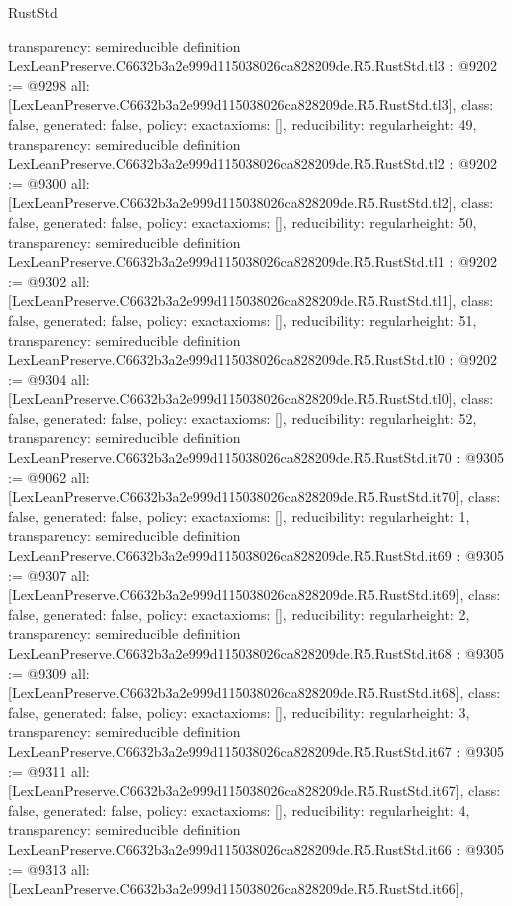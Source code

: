 \begin{lexlean}{RustStd}
\begin{coremodule}
{  transparency: semireducible
}
definition LexLeanPreserve.C6632b3a2e999d115038026ca828209de.R5.RustStd.tl3 : @9202 := @9298 {
  all: [LexLeanPreserve.C6632b3a2e999d115038026ca828209de.R5.RustStd.tl3],
  class: false,
  generated: false,
  policy: exact{axioms: []},
  reducibility: regular{height: 49},
  transparency: semireducible
}
definition LexLeanPreserve.C6632b3a2e999d115038026ca828209de.R5.RustStd.tl2 : @9202 := @9300 {
  all: [LexLeanPreserve.C6632b3a2e999d115038026ca828209de.R5.RustStd.tl2],
  class: false,
  generated: false,
  policy: exact{axioms: []},
  reducibility: regular{height: 50},
  transparency: semireducible
}
definition LexLeanPreserve.C6632b3a2e999d115038026ca828209de.R5.RustStd.tl1 : @9202 := @9302 {
  all: [LexLeanPreserve.C6632b3a2e999d115038026ca828209de.R5.RustStd.tl1],
  class: false,
  generated: false,
  policy: exact{axioms: []},
  reducibility: regular{height: 51},
  transparency: semireducible
}
definition LexLeanPreserve.C6632b3a2e999d115038026ca828209de.R5.RustStd.tl0 : @9202 := @9304 {
  all: [LexLeanPreserve.C6632b3a2e999d115038026ca828209de.R5.RustStd.tl0],
  class: false,
  generated: false,
  policy: exact{axioms: []},
  reducibility: regular{height: 52},
  transparency: semireducible
}
definition LexLeanPreserve.C6632b3a2e999d115038026ca828209de.R5.RustStd.it70 : @9305 := @9062 {
  all: [LexLeanPreserve.C6632b3a2e999d115038026ca828209de.R5.RustStd.it70],
  class: false,
  generated: false,
  policy: exact{axioms: []},
  reducibility: regular{height: 1},
  transparency: semireducible
}
definition LexLeanPreserve.C6632b3a2e999d115038026ca828209de.R5.RustStd.it69 : @9305 := @9307 {
  all: [LexLeanPreserve.C6632b3a2e999d115038026ca828209de.R5.RustStd.it69],
  class: false,
  generated: false,
  policy: exact{axioms: []},
  reducibility: regular{height: 2},
  transparency: semireducible
}
definition LexLeanPreserve.C6632b3a2e999d115038026ca828209de.R5.RustStd.it68 : @9305 := @9309 {
  all: [LexLeanPreserve.C6632b3a2e999d115038026ca828209de.R5.RustStd.it68],
  class: false,
  generated: false,
  policy: exact{axioms: []},
  reducibility: regular{height: 3},
  transparency: semireducible
}
definition LexLeanPreserve.C6632b3a2e999d115038026ca828209de.R5.RustStd.it67 : @9305 := @9311 {
  all: [LexLeanPreserve.C6632b3a2e999d115038026ca828209de.R5.RustStd.it67],
  class: false,
  generated: false,
  policy: exact{axioms: []},
  reducibility: regular{height: 4},
  transparency: semireducible
}
definition LexLeanPreserve.C6632b3a2e999d115038026ca828209de.R5.RustStd.it66 : @9305 := @9313 {
  all: [LexLeanPreserve.C6632b3a2e999d115038026ca828209de.R5.RustStd.it66],
}
\end{coremodule}
\end{lexlean}
